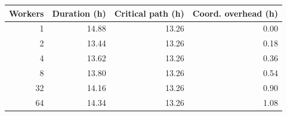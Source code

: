 \begin{tabular}{rrrr}
\toprule
Workers & Duration (h) & Critical path (h) & Coord. overhead (h) \\
\midrule
1 & 14.88 & 13.26 & 0.00 \\
2 & 13.44 & 13.26 & 0.18 \\
4 & 13.62 & 13.26 & 0.36 \\
8 & 13.80 & 13.26 & 0.54 \\
32 & 14.16 & 13.26 & 0.90 \\
64 & 14.34 & 13.26 & 1.08 \\
\bottomrule
\end{tabular}
